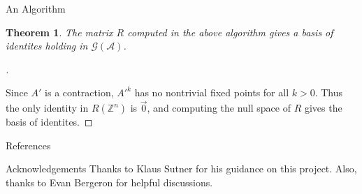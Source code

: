 \documentclass[a0]{a0poster}
\theoremstyle{pleasant}
\newtheorem{theorem}{Theorem}
\newcommand{\paren}[1]{\left(#1\right)}
\newcommand{\Z}{\mathbb Z}
\newcommand{\A}{\mathcal A}
\newcommand{\gp}[1]{\mathcal G\paren{#1}}
\newenvironment{myproof}[1][\proofname]{%
    \begin{proof}[#1]$ $\,
}{%
  \end{proof}
}
\begin{document}
\begin{multicols}{3}
\begin{poster-section}{An Algorithm}
\begin{theorem}
    The matrix $R$ computed in the above algorithm gives a basis of
    identites holding in $\gp{\A}$.
\end{theorem}
\begin{myproof}
    Since $A'$ is a contraction, $A'^k$ has no nontrivial fixed points for
    all $k > 0$. Thus the only identity in $R(\Z^n)$ is $\vec{0}$, and
    computing the null space of $R$ gives the basis of identites.
\end{myproof}
\end{poster-section}

\begin{poster-section}{References}
    \printbibliography[heading=none]
\end{poster-section}

\begin{poster-section}{Acknowledgements}
    \Large
    Thanks to Klaus Sutner for his guidance on this project. Also, thanks to
    Evan Bergeron for helpful discussions.
\end{poster-section}

\end{multicols}
\end{document}
